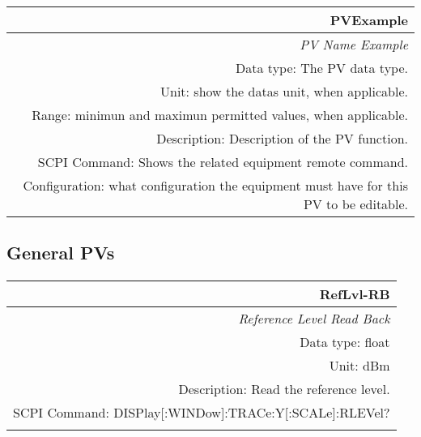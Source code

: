 \documentclass[openany]{article}
\begin{document}
		\newcommand{\FuncTableBorderColor}{gray!50} %
		\newcommand{\nofunc}{\cellcolor{gray!20}\color{gray}} %
		\newcommand{\yesfunc}{\cellcolor{white}\color{black}} %

		\bigskip
		\begin{tabular}{N}
			\hline
			\bfseries PVExample \\ \hline
			\emph{PV Name Example} \\
			Data type: The PV data type. \\
			Unit: show the datas unit, when applicable. \\
			Range: minimun and maximun permitted values, when applicable. \\
			Description: Description of the PV function. \\
			SCPI Command: Shows the related equipment remote command. \\
			Configuration: what configuration the equipment must have for this PV to be editable. \\

		\end{tabular}


	\subsection{General PVs}\label{pvgroup:function}
		

		\paragraph{} %

		\begin{tabular}{N}
			\hline
			\bfseries RefLvl-RB \\ \hline
			\emph{Reference Level Read Back} \\
			Data type: float \\
			Unit: dBm \\
			Description: Read the reference level. \\
			SCPI Command: DISPlay[:WINDow]:TRACe:Y[:SCALe]:RLEVel? \\
			\\

		\end{tabular}
\end{document}
